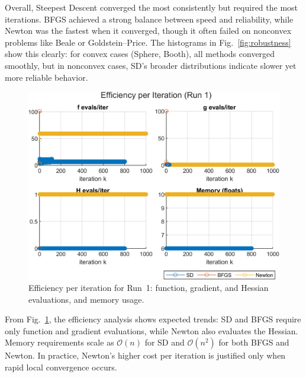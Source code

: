\documentclass[11pt]{article}
\begin{document}
	Overall, Steepest Descent converged the most consistently but required the most iterations.
	BFGS achieved a strong balance between speed and reliability, while Newton was the fastest when it converged,
	though it often failed on nonconvex problems like Beale or Goldstein–Price.  
	The histograms in Fig.~\ref{fig:robustness} show this clearly: for convex cases (Sphere, Booth),
	all methods converged smoothly, but in nonconvex cases, SD’s broader distributions indicate slower yet more reliable behavior.
	
	\begin{figure}[htbp]
		\centering
		\includegraphics[width=\linewidth]{plots/eff_run1_2x2.png}
		\caption{Efficiency per iteration for Run~1: function, gradient, and Hessian evaluations, and memory usage.}
		\label{fig:eff}
	\end{figure}
	
	From Fig.~\ref{fig:eff}, the efficiency analysis shows expected trends:
	SD and BFGS require only function and gradient evaluations, while Newton also evaluates the Hessian.
	Memory requirements scale as $\mathcal{O}(n)$ for SD and $\mathcal{O}(n^2)$ for both BFGS and Newton.
	In practice, Newton’s higher cost per iteration is justified only when rapid local convergence occurs.
	
\end{document}
